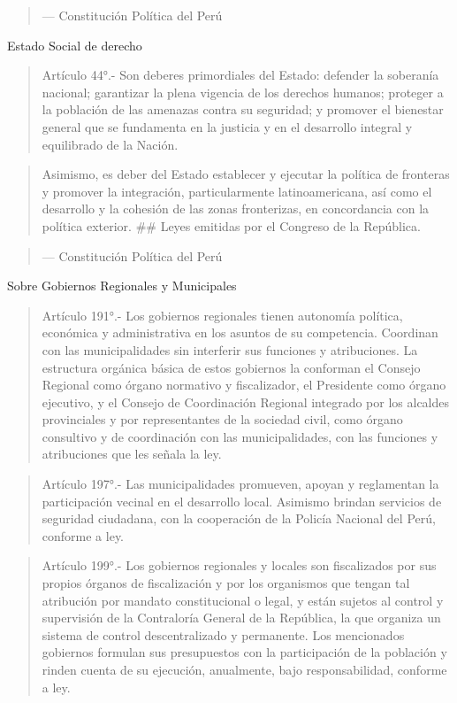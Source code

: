 \documentclass[
]{book}
\begin{document}
\begin{quote}
--- Constitución Política del Perú
\end{quote}

Estado Social de derecho

\begin{quote}
Artículo 44°.- Son deberes primordiales del Estado: defender la soberanía
nacional; garantizar la plena vigencia de los derechos humanos; proteger a la
población de las amenazas contra su seguridad; y promover el bienestar general
que se fundamenta en la justicia y en el desarrollo integral y equilibrado de la
Nación.
\end{quote}

\begin{quote}
Asimismo, es deber del Estado establecer y ejecutar la política de fronteras y
promover la integración, particularmente latinoamericana, así como el desarrollo y
la cohesión de las zonas fronterizas, en concordancia con la política exterior.
\#\# Leyes emitidas por el Congreso de la República.
\end{quote}

\begin{quote}
--- Constitución Política del Perú
\end{quote}

Sobre Gobiernos Regionales y Municipales

\begin{quote}
Artículo 191°.- Los gobiernos regionales tienen autonomía política, económica y
administrativa en los asuntos de su competencia. Coordinan con las
municipalidades sin interferir sus funciones y atribuciones.
La estructura orgánica básica de estos gobiernos la conforman el Consejo
Regional como órgano normativo y fiscalizador, el Presidente como órgano
ejecutivo, y el Consejo de Coordinación Regional integrado por los alcaldes
provinciales y por representantes de la sociedad civil, como órgano consultivo y
de coordinación con las municipalidades, con las funciones y atribuciones que les
señala la ley.
\end{quote}

\begin{quote}
Artículo 197°.- Las municipalidades promueven, apoyan y reglamentan la
participación vecinal en el desarrollo local. Asimismo brindan servicios de
seguridad ciudadana, con la cooperación de la Policía Nacional del Perú,
conforme a ley.
\end{quote}

\begin{quote}
Artículo 199°.- Los gobiernos regionales y locales son fiscalizados por sus
propios órganos de fiscalización y por los organismos que tengan tal atribución
por mandato constitucional o legal, y están sujetos al control y supervisión de la
Contraloría General de la República, la que organiza un sistema de control
descentralizado y permanente. Los mencionados gobiernos formulan sus
presupuestos con la participación de la población y rinden cuenta de su ejecución,
anualmente, bajo responsabilidad, conforme a ley.
\end{quote}
\end{document}
